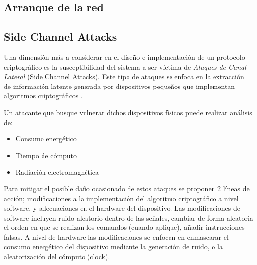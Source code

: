 \documentclass{article}
\begin{document}
    \subsection{Arranque de la red}






        \subsection{Side Channel Attacks}

            Una dimensión más a considerar en el diseño e implementación de un protocolo criptográfico es la susceptibilidad del sistema a ser víctima de \textit{Ataques de Canal Lateral} (Side Channel Attacks). Este tipo de ataques se enfoca en la extracción de información latente generada por dispositivos pequeños que implementan algoritmos criptográficos \cite{shim2015survey}.

            Un atacante que busque vulnerar dichos dispositivos físicos puede realizar análisis de:
            \begin{itemize}
                \item Consumo energético
                \item Tiempo de cómputo
                \item Radiación electromagnética
            \end{itemize}

            Para mitigar el posible daño ocasionado de estos ataques se proponen 2 líneas de acción; modificaciones a la implementación del algoritmo criptográfico a nivel software, y adecuaciones en el hardware del dispositivo. Las modificaciones de software incluyen ruido aleatorio dentro de las señales, cambiar de forma aleatoria el orden en que se realizan los comandos (cuando aplique), añadir instrucciones falsas. A nivel de hardware las modificaciones se enfocan en enmascarar el consumo energético del dispositivo mediante la generación de ruido, o la aleatorización del cómputo (clock).

\end{document}
